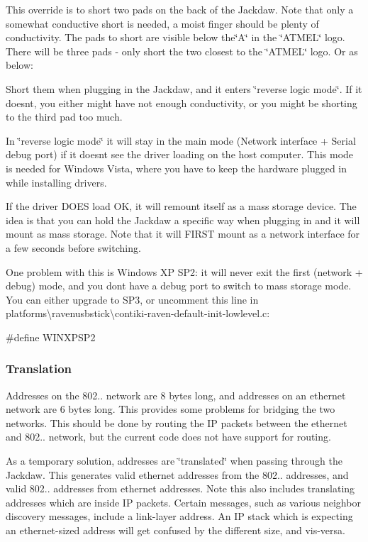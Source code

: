 This override is to short two pads on the back of the Jackdaw. Note that only a somewhat conductive short is needed, a moist finger should be plenty of conductivity. The pads to short are visible below the\char`\"{}\+A\char`\"{} in the \char`\"{}\+A\+T\+M\+E\+L\char`\"{} logo. There will be three pads -\/ only short the two closest to the \char`\"{}\+A\+T\+M\+E\+L\char`\"{} logo. Or as below\+:



Short them when plugging in the Jackdaw, and it enters \char`\"{}reverse logic mode\char`\"{}. If it doesn\textquotesingle{}t, you either might have not enough conductivity, or you might be shorting to the third pad too much.

In \char`\"{}reverse logic mode\char`\"{} it will stay in the main mode (Network interface + Serial debug port) if it doesn\textquotesingle{}t see the driver loading on the host computer. This mode is needed for Windows Vista, where you have to keep the hardware plugged in while installing drivers.

If the driver D\+O\+ES load OK, it will remount itself as a mass storage device. The idea is that you can hold the Jackdaw a specific way when plugging in and it will mount as mass storage. Note that it will F\+I\+R\+ST mount as a network interface for a few seconds before switching.

One problem with this is Windows XP S\+P2\+: it will never exit the first (network + debug) mode, and you don\textquotesingle{}t have a debug port to switch to mass storage mode. You can either upgrade to S\+P3, or uncomment this line in platforms\textbackslash{}ravenusbstick\textbackslash{}contiki-\/raven-\/default-\/init-\/lowlevel.\+c\+:


\begin{DoxyCode}
\textcolor{preprocessor}{#define WINXPSP2}
\end{DoxyCode}
\hypertarget{a00067_Address}{}\subsubsection{Translation}\label{a00067_Address}
Addresses on the 802.. network are 8 bytes long, and addresses on an ethernet network are 6 bytes long. This provides some problems for bridging the two networks. This should be done by routing the IP packets between the ethernet and 802.. network, but the current code does not have support for routing.

As a temporary solution, addresses are \char`\"{}translated\char`\"{} when passing through the Jackdaw. This generates valid ethernet addresses from the 802.. addresses, and valid 802.. addresses from ethernet addresses. Note this also includes translating addresses which are inside IP packets. Certain messages, such as various neighbor discovery messages, include a link-\/layer address. An IP stack which is expecting an ethernet-\/sized address will get confused by the different size, and vis-\/versa.

